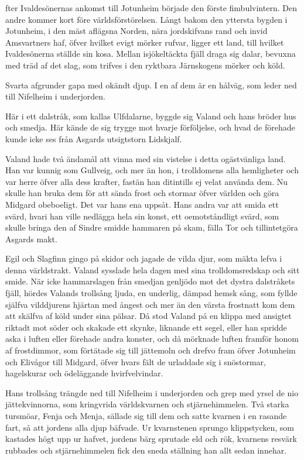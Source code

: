 \dropcapE fter Ivaldesönernas ankomst till Jotunheim började den förste
fimbulvintern. Den andre kommer kort före världsförstörelsen. Långt
bakom den yttersta bygden i Jotunheim, i den mäst aflägsna Norden, nära
jordskifvans rand och invid Amsvartners haf, öfver hvilket evigt mörker
rufvar, ligger ett land, till hvilket Ivaldesönerna ställde sin kosa.
Mellan isjökeltäckta fjäll draga sig dalar, bevuxna med träd af det
slag, som trifves i den ryktbara Järnskogens mörker och köld.

Svarta afgrunder gapa med okändt djup. I en af dem är en hålväg, som
leder ned till Nifelheim i underjorden.

Här i ett dalstråk, som kallas Ulfdalarne, byggde sig Valand och hans
bröder hus och smedja. Här kände de sig trygge mot hvarje förföljelse,
och hvad de förehade kunde icke ses från Asgards utsigtstorn Lidskjalf.

Valand hade två ändamål att vinna med sin vistelse i detta ogästvänliga
land. Han var kunnig som Gullveig, och mer än hon, i trolldomens alla
hemligheter och var herre öfver alla dess krafter, fastän han ditintills
ej velat använda dem. Nu skulle han bruka dem för att sända frost och
stormar öfver världen och göra Midgard obeboeligt. Det var hans ena
uppsåt. Hans andra var att smida ett svärd, hvari han ville nedlägga
hela sin konst, ett oemotståndligt svärd, som skulle bringa den af
Sindre smidde hammaren på skam, fälla Tor och tillintetgöra Asgards
makt.

Egil och Slagfinn gingo på skidor och jagade de vilda djur, som mäkta
lefva i denna världstrakt. Valand sysslade hela dagen med sina
trolldomsredskap och sitt smide. När icke hammarslagen från smedjan
genljödo mot det dystra dalstråkets fjäll, hördes Valands trollsång
ljuda, en underlig, dämpad hemsk sång, som fyllde själfva vilddjurens
hjärtan med ångest och mer än den värsta frostnatt kom dem att skälfva
af köld under sina pälsar. Då stod Valand på en klippa med ansigtet
riktadt mot söder och skakade ett skynke, liknande ett segel, eller han
spridde aska i luften eller förehade andra konster, och då mörknade
luften framför honom af frostdimmor, som förtätade sig till jättemoln
och drefvo fram öfver Jotunheim och Elivågor till Midgard, öfver hvars
fält de urladdade sig i snöstormar, hagelskurar och ödeläggande
hvirfvelvindar.

Hans trollsång trängde ned till Nifelheim i underjorden och grep med
yrsel de nio jättekvinnorna, som kringvrida världskvarnen och
stjärnehimmelen. Två starka tursmöar, Fenja och Menja, sällade sig till
dem och satte kvarnen i en rasande fart, så att jordens alla djup
bäfvade. Ur
kvarnstenen
sprungo klippstycken, som kastades högt upp ur hafvet, jordens bärg
sprutade eld och rök, kvarnens resvärk rubbades och stjärnehimmelen fick
den sneda ställning han allt sedan innehar.

